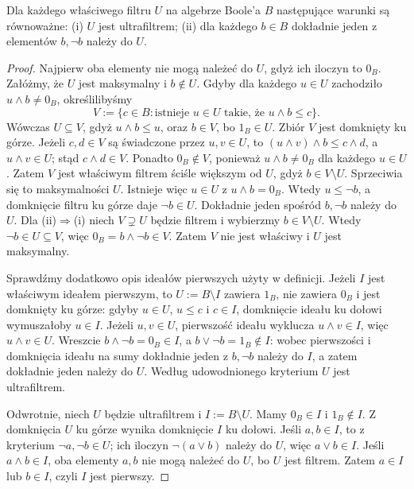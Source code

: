 \begin{lemat}\label{lem:bpi-ultrafilter-criterion}
Dla każdego właściwego filtru $U$ na algebrze Boole'a $B$
następujące warunki są równoważne:
(i) $U$ jest ultrafiltrem;
(ii) dla każdego $b\in B$ dokładnie jeden z elementów
$b,\neg b$ należy do $U$.
\end{lemat}
\begin{proof}
Najpierw oba elementy nie mogą należeć do $U$, gdyż
ich iloczyn to $0_B$. Załóżmy, że $U$ jest maksymalny i $b\notin U$.
Gdyby dla każdego $u\in U$ zachodziło
$u\wedge b\ne0_B$, określilibyśmy
\[
V:=\{c\in B:\text{istnieje }u\in U
             \text{ takie, że }u\wedge b\le c\}.
\]
Wówczas $U\subseteq V$, gdyż $u\wedge b\le u$,
oraz $b\in V$, bo $1_B\in U$.
Zbiór $V$ jest domknięty ku górze.
Jeżeli $c,d\in V$ są świadczone przez
$u,v\in U$, to
$(u\wedge v)\wedge b\le c\wedge d$,
a $u\wedge v\in U$;
stąd $c\wedge d\in V$.
Ponadto $0_B\notin V$, ponieważ
$u\wedge b\ne0_B$ dla każdego $u\in U$.
Zatem $V$ jest właściwym filtrem
ściśle większym od $U$,
gdyż $b\in V\setminus U$.
Sprzeciwia się to maksymalności $U$.
Istnieje więc $u\in U$ z
$u\wedge b=0_B$. Wtedy $u\leq\neg b$,
a domknięcie filtru ku górze daje $\neg b\in U$.
Dokładnie jeden spośród $b,\neg b$ należy do $U$.
Dla (ii)$\Rightarrow$(i) niech $V\supsetneq U$ będzie
filtrem i wybierzmy $b\in V\setminus U$. Wtedy
$\neg b\in U\subseteq V$, więc $0_B=b\wedge\neg b\in V$.
Zatem $V$ nie jest właściwy i $U$ jest maksymalny.

Sprawdźmy dodatkowo opis ideałów pierwszych
użyty w definicji.
Jeżeli $I$ jest właściwym ideałem pierwszym,
to $U:=B\setminus I$ zawiera $1_B$,
nie zawiera $0_B$ i jest domknięty ku górze:
gdyby $u\in U$, $u\le c$ i $c\in I$,
domknięcie ideału ku dołowi wymuszałoby $u\in I$.
Jeżeli $u,v\in U$, pierwszość ideału
wyklucza $u\wedge v\in I$,
więc $u\wedge v\in U$.
Wreszcie $b\wedge\neg b=0_B\in I$,
a $b\vee\neg b=1_B\notin I$:
wobec pierwszości i domknięcia ideału
na sumy dokładnie jeden z $b,\neg b$
należy do $I$, a zatem dokładnie jeden
należy do $U$.
Według udowodnionego kryterium $U$
jest ultrafiltrem.

Odwrotnie, niech $U$ będzie ultrafiltrem
i $I:=B\setminus U$.
Mamy $0_B\in I$ i $1_B\notin I$.
Z domknięcia $U$ ku górze wynika
domknięcie $I$ ku dołowi.
Jeśli $a,b\in I$, to z kryterium
$\neg a,\neg b\in U$; ich iloczyn
$\neg(a\vee b)$ należy do $U$,
więc $a\vee b\in I$.
Jeśli $a\wedge b\in I$, oba elementy
$a,b$ nie mogą należeć do $U$,
bo $U$ jest filtrem. Zatem
$a\in I$ lub $b\in I$,
czyli $I$ jest pierwszy.
\end{proof}

